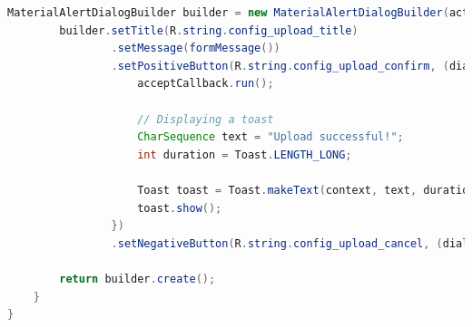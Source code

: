 \documentclass[oneside,solution]{android-assign}
\begin{document}
\begin{lstlisting}[language=java]
        MaterialAlertDialogBuilder builder = new MaterialAlertDialogBuilder(activity);
        builder.setTitle(R.string.config_upload_title)
                .setMessage(formMessage())
                .setPositiveButton(R.string.config_upload_confirm, (dialog, id) -> {
                    acceptCallback.run();

                    // Displaying a toast
                    CharSequence text = "Upload successful!";
                    int duration = Toast.LENGTH_LONG;

                    Toast toast = Toast.makeText(context, text, duration);
                    toast.show();
                })
                .setNegativeButton(R.string.config_upload_cancel, (dialog, id) -> cancelCallback.run());

        return builder.create();
    }
}
\end{lstlisting}
\end{document}
